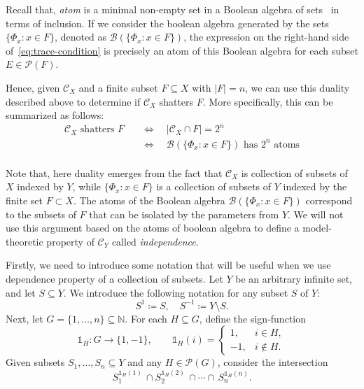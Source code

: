 Recall that, \emph{atom} is a minimal non-empty set in a Boolean algebra of sets~\cite[Chap 1]{vandenDries1998} in terms of inclusion. If we consider the boolean algebra generated by the sets $\{\Phi_x : x \in F\}$, denoted as $\mathcal{B}(\{\Phi_x : x \in F\})$, the expression on the right-hand side of~\ref{eq:trace-condition} is precisely an atom of this Boolean algebra for each subset $E \in \mathcal{P}(F)$.

Hence, given $\mathcal{C}_X$ and a finite subset $F \subseteq X$ with $|F| = n$, we can use this duality described above to determine if $\mathcal{C}_X$ shatters $F$. More specifically, this can be summarized as follows:
\[
    \begin{aligned}
        \mathcal{C}_X \text{ shatters } F \quad &\Leftrightarrow \quad |\mathcal{C}_X \cap F| = 2^n \\
        &\Leftrightarrow \quad \mathcal{B}(\{\Phi_x : x \in F\}) \text{ has } 2^n \text{ atoms} \\
    \end{aligned}
\]

Note that, here duality emerges from the fact that $\mathcal{C}_X$ is collection of subsets of $X$ indexed by $Y$, while $\{\Phi_x : x \in F\}$ is a collection of subsets of $Y$ indexed by the finite set $F\subset X$. The atoms of the Boolean algebra $\mathcal{B}(\{\Phi_x : x \in F\})$ correspond to the subsets of $F$ that can be isolated by the parameters from $Y$. We will not use this argument based on the atoms of boolean algebra to define a model-theoretic property of $\mathcal{C}_Y$ called \textit{independence}.

Firstly, we need to introduce some notation that will be useful when we use dependence property of a collection of subsets. Let \(Y\) be an arbitrary infinite set, and let \(S \subseteq Y\). We introduce the following notation for any subset \(S\) of \(Y\):
\[
    S^1 \coloneqq S,
    \quad
    S^{-1} \coloneqq Y \setminus S.
\]
\noindent
Next, let \(G = \{1,\dots,n\}\subseteq\mathbb{N}\). For each \(H\subseteq G\), define the sign‐function
\[
    \begin{equation}
        \label{eq:sign-function}
        \mathds{1}_H : G \to \{1,-1\},
        \qquad
        \mathds{1}_H(i) =
        \begin{cases}
            1,  & i\in H,\\
            -1, & i\notin H.
        \end{cases}
    \end{equation}
\]
\noindent
Given subsets \(S_1,\dots,S_n \subseteq Y\) and any \(H\in\mathcal P(G)\), consider the intersection
\[
    S_1^{\mathds{1}_H(1)}
    \,\cap
    S_2^{\mathds{1}_H(2)}
    \,\cap\cdots\cap\,
    S_n^{\mathds{1}_H(n)}.
\]

